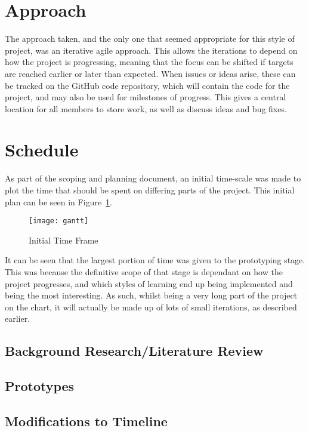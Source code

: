\section{Approach}

The approach taken, and the only one that seemed appropriate for this style of
project, was an iterative agile approach. This allows the iterations to depend
on how the project is progressing, meaning that the focus can be shifted if targets
are reached earlier or later than expected.
When issues or ideas arise, these can be tracked on the GitHub code repository,
which will contain the code for the project, and may also be used for milestones
of progress. This gives a central location for all members to store work, as well
as discuss ideas and bug fixes.

\section{Schedule}

As part of the scoping and planning document, an initial time-scale was made
to plot the time that should be spent on differing parts of the project.
This initial plan can be seen in Figure~\ref{fig:gantt}.

\begin{figure}[h!]
    \centering
    \texttt{[image: gantt]}
    \caption{Initial Time Frame}%
    \label{fig:gantt}
\end{figure}

It can be seen that the largest portion of time was given to the prototyping
stage. This was because the definitive scope of that stage is dependant on how
the project progresses, and which styles of learning end up being implemented and
being the most interesting. As such, whilst being a very long part of the project
on the chart, it will actually be made up of lots of small iterations, as described
earlier.

\subsection{Background Research/Literature Review}

\subsection{Prototypes}

\subsection{Modifications to Timeline}
